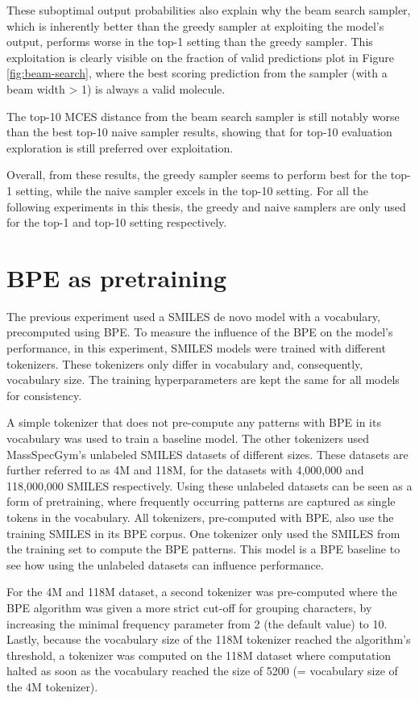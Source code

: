 These suboptimal output probabilities also explain why the beam search sampler, which is inherently better than the greedy sampler at exploiting the model's output, performs worse in the top-1 setting than the greedy sampler.
This exploitation is clearly visible on the fraction of valid predictions plot in Figure \ref{fig:beam-search}, where the best scoring prediction from the sampler (with a beam width > 1) is always a valid molecule.

The top-10 MCES distance from the beam search sampler is still notably worse than the best top-10 naive sampler results, showing that for top-10 evaluation exploration is still preferred over exploitation.

Overall, from these results, the greedy sampler seems to perform best for the top-1 setting, while the naive sampler excels in the top-10 setting.
For all the following experiments in this thesis, the greedy and naive samplers are only used for the top-1 and top-10 setting respectively.

\section{\ac{BPE} as pretraining}

The previous experiment used a SMILES de novo model with a vocabulary, precomputed using \ac{BPE}.
To measure the influence of the \acf{BPE} on the model's performance, in this experiment, SMILES models were trained with different tokenizers.
These tokenizers only differ in vocabulary and, consequently, vocabulary size.
The training hyperparameters are kept the same for all models for consistency.

A simple tokenizer that does not pre-compute any patterns with \ac{BPE} in its vocabulary was used to train a baseline model.
The other tokenizers used MassSpecGym's unlabeled SMILES datasets of different sizes.
These datasets are further referred to as 4M and 118M, for the datasets with 4,000,000 and 118,000,000 SMILES respectively.
Using these unlabeled datasets can be seen as a form of pretraining, where frequently occurring patterns are captured as single tokens in the vocabulary.
All tokenizers, pre-computed with \ac{BPE}, also use the training SMILES in its \ac{BPE} corpus.
One tokenizer only used the SMILES from the training set to compute the \ac{BPE} patterns.
This model is a \ac{BPE} baseline to see how using the unlabeled datasets can influence performance.

For the 4M and 118M dataset, a second tokenizer was pre-computed where the \ac{BPE} algorithm was given a more strict cut-off for grouping characters, by increasing the minimal frequency parameter from 2 (the default value) to 10.
Lastly, because the vocabulary size of the 118M tokenizer reached the algorithm's threshold, a tokenizer was computed on the 118M dataset where computation halted as soon as the vocabulary reached the size of 5200 (= vocabulary size of the 4M tokenizer). 

